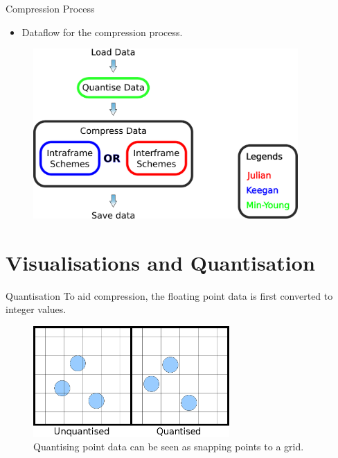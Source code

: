 \documentclass{beamer}
\begin{document}
\begin{frame}{Compression Process}
  \begin{itemize}
   \item Dataflow for the compression process.
  \end{itemize}

  \begin{figure}
    \includegraphics[width=0.9\textwidth]{legends.png}
  \end{figure}
\end{frame}


\section{Visualisations and Quantisation}

\begin{frame}{Quantisation}
To aid compression, the floating point data is first converted to integer values.

\begin{figure}
  \centering
  \includegraphics[width=75mm]{min-images/quantisation.png}
  \caption{Quantising point data can be seen as snapping points to a grid.}
\end{figure}
\end{frame}
\end{document}
